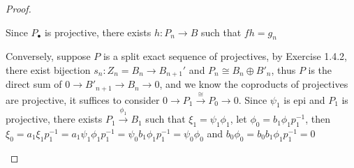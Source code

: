 \documentclass{article}
\theoremstyle{definition}
\theoremstyle{remark}
\theoremstyle{definition}
\begin{document}
\begin{proof}
\begin{center}
\end{center}
Since $P_\bullet$ is projective, there exists $h:P_n\to B$ such that $fh=g_n$ \par
Conversely, suppose $P$ is a split exact sequence of projectives, by Exercise 1.4.2, there exist bijection $s_n:Z_n=B_n\to B_{n+1}'$ and $P_n\cong B_n\oplus B'_n$, thus $P$ is the direct sum of $0\to B'_{n+1}\to B_n\to0$, and we know the coproducts of projectives are projective, it suffices to consider $0\to P_1\xrightarrow{\cong}P_0\to 0$. Since $\psi_1$ is epi and $P_1$ is projective, there exists $P_1\xrightarrow{\phi_1}B_1$ such that $\xi_1=\psi_1\phi_1$, let $\phi_0=b_1\phi_1p_1^{-1}$, then $\xi_0=a_1\xi_1p_1^{-1}=a_1\psi_1\phi_1p_1^{-1}=\psi_0b_1\phi_1p_1^{-1}=\psi_0\phi_0$ and $b_0\phi_0=b_0b_1\phi_1p_1^{-1}=0$
\begin{center}
\end{center}
\end{proof}
\end{document}
